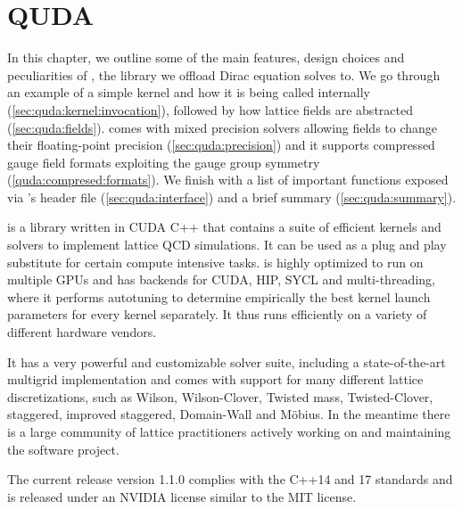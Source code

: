 \chapter{QUDA}
\label{ch:p1:quda}




In this chapter, we outline some of the main features, design choices and peculiarities of \quda, the library we offload Dirac equation solves to.
We go through an example of a simple kernel and how it is being called internally (\cref{sec:quda:kernel:invocation}), followed by how lattice fields are abstracted (\cref{sec:quda:fields}).
\Quda comes with mixed precision solvers allowing fields to change their floating-point precision (\cref{sec:quda:precision}) and it supports compressed gauge field formats exploiting the gauge group symmetry (\cref{quda:compresed:formats}).
We finish with a list of important functions exposed via \quda's header file (\cref{sec:quda:interface}) and a brief summary (\cref{sec:quda:summary}).

\Quda \cite{QUDApaper} is a library written in CUDA C++ that contains a suite of efficient kernels and solvers to implement lattice QCD simulations. It can be used as a plug and play substitute for certain compute intensive tasks.
\Quda is highly optimized to run on multiple GPUs and has backends for CUDA, HIP, SYCL and multi-threading, where it performs autotuning to determine empirically the best kernel launch parameters for every kernel separately.
It thus runs efficiently on a variety of different hardware vendors.

It has a very powerful and customizable solver suite, including a state-of-the-art multigrid implementation and comes with support for many different lattice discretizations, such as Wilson, Wilson-Clover, Twisted mass, Twisted-Clover, staggered, improved staggered, Domain-Wall and Möbius. In the meantime there is a large community of lattice practitioners actively working on and maintaining the software project.

The current release version 1.1.0 complies with the C++14 and 17 standards and is released under an NVIDIA license similar to the MIT license.

